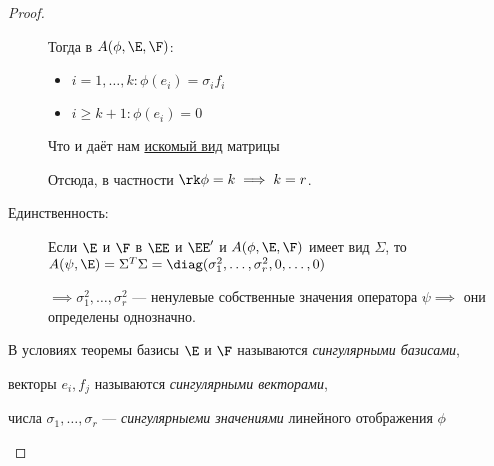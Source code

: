 \documentclass[a4paper]{article}
\begin{document}
\begin{colloq}
\begin{proof}
\begin{description}
                    Тогда в $A(\phi, \E, \F)$:
                    \begin{itemize}
                        \item $i = 1, \dots, k \colon \phi(e_i) = \sigma_i f_i$
                        \item $i \geq k + 1 \colon \phi(e_i) = 0$
                    \end{itemize}

                    Что и даёт нам \hyperref[lec31:SVD_matrix]{искомый вид} матрицы

                    \bigskip
                    Отсюда, в частности $\rk \phi = k \implies k = r$.

                    \item[Единственность:] \mbox{}
                    \item[] 
                        Если $\E$ и $\F$ в $\EE$ и $\EE'$ и $A(\phi, \E, \F)$ имеет вид \hyperref[lec31:SVD_matrix]{$\Sigma$}, то $A(\psi, \E) = \Sigma^{T} \Sigma = \diag(\sigma_1^2, \dots, \sigma_r^2, 0, \dots, 0) $
                        
                        $\implies \sigma_1^2, \dots, \sigma_r^2$ --- ненулевые собственные значения оператора $\psi \implies$ они определены однозначно.
            
                \end{description}

                \bigskip    
                \begin{definition}
                    В условиях теоремы базисы $\E$ и $\F$ называются \textit{сингулярными базисами}, 
                    
                    векторы $e_i, f_j$ называются \textit{сингулярными векторами}, 
                    
                    числа $\sigma_1, \dots, \sigma_r$ --- \textit{сингулярныеми значениями} линейного отображения $\phi$
                \end{definition}

                \begin{comment}
                    \begin{enumerate} 
                        \item Базисы $\E$ и $\F$ определены, вообще говоря, неоднозначно.
                        \item Доказательство теоремы даёт алгоритм нахождения сингулярных значений и сингулярных базисов.
                        \item Если $\E$ и $\F$ --- сингулярные базисы для линейного отображения $\phi$ и $A(\phi, \E, \F) = $ \hyperref[lec31:SVD_matrix]{$\Sigma$}, то $\E$ и $\F$ --- сингулярные базисы для линейного отображения $\phi^{*} = A(\phi, \F, \E) = \Sigma^T$
                    \end{enumerate}
                \end{comment}
            \end{proof}

    \end{colloq}
\end{document}
